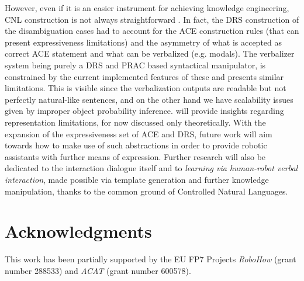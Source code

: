 \documentclass[oribibl]{llncs}
\begin{document}
However, even if it is an easier instrument for achieving knowledge 
engineering, CNL construction is not always straightforward \cite
{Schwitter05alayered}. In fact, the DRS construction of the 
disambiguation cases had to account for the ACE construction rules 
(that can present expressiveness limitations) and the asymmetry of 
what is accepted as correct ACE statement and what can be verbalized 
(e.g. modals). The verbalizer system being purely a DRS and PRAC 
based syntactical manipulator, is constrained by the current 
implemented features of these and presents similar limitations. This 
is visible since the verbalization outputs are readable but not 
perfectly natural-like sentences, and on the other hand we have 
scalability issues given by improper object probability inference. 
will provide insights regarding representation limitations, for now 
discussed only theoretically. With the expansion of the 
expressiveness set of ACE and DRS, future work will aim towards how 
to make use of such abstractions in order to provide robotic 
assistants with further means of expression. Further research will 
also be dedicated to the interaction dialogue itself and to \textit
{learning via human-robot verbal interaction}, made possible via 
template generation and further knowledge manipulation, thanks to 
the common ground of Controlled Natural Languages.

\section{Acknowledgments}
This work has been partially supported by the EU FP7 Projects
\emph{RoboHow} (grant number 288533) and \emph{ACAT} (grant number 600578).

%
{}

%
\end{document}

